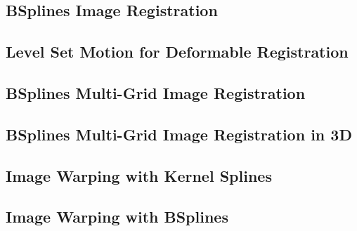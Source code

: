 %
%
%
%
%
%


\subsection{BSplines Image Registration}%
\label{sec:BSplinesImageRegistration}



\subsection{Level Set Motion for Deformable Registration}%
\label{sec:LevelSetMotionForDeformableRegistration}



\subsection{BSplines Multi-Grid Image Registration}%
\label{sec:BSplinesMultiGridImageRegistration}



\subsection{BSplines Multi-Grid Image Registration in 3D}%
\label{sec:BSplinesMultiGridImageRegistrationIn3D}



\subsection{Image Warping with Kernel Splines}%
\label{sec:ImageWarpingWithKernelSplines}



\subsection{Image Warping with BSplines}%
\label{sec:ImageWarpingWithBSplines}

